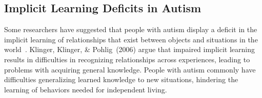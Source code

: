 %
%

\subsection{Implicit Learning Deficits in Autism}



Some researchers have suggested that people with autism display a deficit in the implicit learning of relationships that exist between objects and situations in the world~\cite{MostofskySH:2000:Procedural}. Klinger, Klinger, \& Pohlig~(2006) \nocite{KlingerLG:2006:Implicit} argue that impaired implicit learning results in difficulties in recognizing relationships across experiences, leading to problems with acquiring general knowledge. People with autism commonly have difficulties generalizing learned knowledge to new situations, hindering the learning of behaviors needed for independent living.

